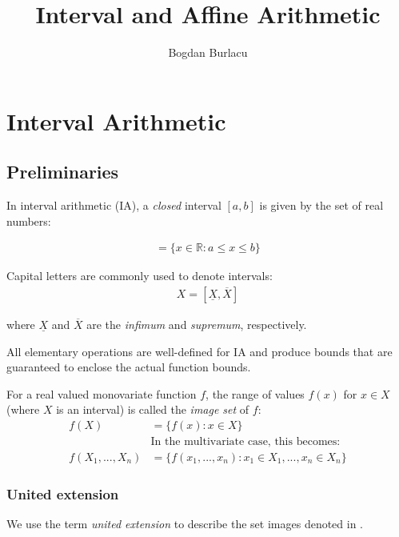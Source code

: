 \documentclass[fontsize=11pt,a4paper]{scrartcl} %
\title{Interval and Affine Arithmetic}
\author{Bogdan Burlacu}
\begin{document}

\maketitle

\section{Interval Arithmetic}

\subsection{Preliminaries}

In interval arithmetic (IA), a \emph{closed} interval $[a,b]$ is given by the set of real numbers:

\begin{align}
    [a,b] = \{ x \in \mathbb{R}: a \leq x \leq b \}
\end{align}

Capital letters are commonly used to denote intervals:
\begin{align}
    X = [ \underline{X}, \overline{X} ]
\end{align}

where $\underline{X}$ and $\overline{X}$ are the \emph{infimum} and \emph{supremum}, respectively. 

All elementary operations are well-defined for IA and produce bounds that are guaranteed to enclose the actual function bounds.

For a real valued monovariate function $f$, the range of values $f(x)$ for $x \in X$ (where $X$ is an interval) is called the \emph{image set} of $f$:
\begin{align}
    f(X) &= \{ f(x) : x \in X \}\label{eq:univariate-image}\\
         &\text{In the multivariate case, this becomes}:\nonumber \\
    f(X_1, ..., X_n) &= \{ f(x_1, ..., x_n) : x_1 \in X_1, ..., x_n \in X_n \}\label{eq:multivariate-image}
\end{align}

\subsubsection{United extension}

We use the term \emph{united extension} to describe the set images denoted in . 
\end{document}
